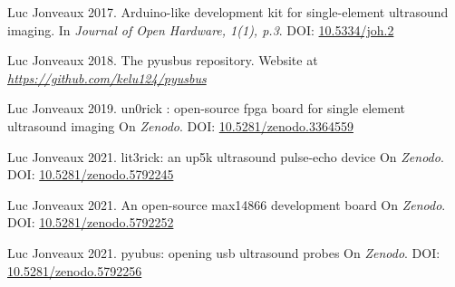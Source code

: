 \documentclass{article}
\begin{document}
  


\begin{thebibliography}{1}

  Luc Jonveaux 2017.
  \newblock  Arduino-like development kit for single-element ultrasound imaging. 
  \newblock In {\em  Journal of Open Hardware, 1(1), p.3}. DOI: \href{http://doi.org/10.5334/joh.2}{10.5334/joh.2}
  
  Luc Jonveaux 2018.
  \newblock The pyusbus repository.
  \newblock Website at {\em\href{https://github.com/kelu124/pyusbus}{https://github.com/kelu124/pyusbus}}
  
  Luc Jonveaux 2019.
  \newblock  un0rick : open-source fpga board for single element ultrasound imaging
  \newblock On {\em  Zenodo}. DOI: \href{http://doi.org/10.5281/zenodo.3364559}{10.5281/zenodo.3364559}
  
  Luc Jonveaux 2021.
  \newblock lit3rick: an up5k ultrasound pulse-echo device %
  \newblock On {\em  Zenodo}. DOI: \href{http://doi.org/10.5281/zenodo.5792245}{10.5281/zenodo.5792245}
  
  Luc Jonveaux 2021.
  \newblock An open-source max14866 development board %
  \newblock On {\em  Zenodo}. DOI: \href{http://doi.org/10.5281/zenodo.5792252}{10.5281/zenodo.5792252}
  
  Luc Jonveaux 2021.
  \newblock  pyubus: opening usb ultrasound probes  %
  \newblock On {\em  Zenodo}. DOI: \href{http://doi.org/10.5281/zenodo.5792256}{10.5281/zenodo.5792256}
  
\end{thebibliography}
\end{document}
